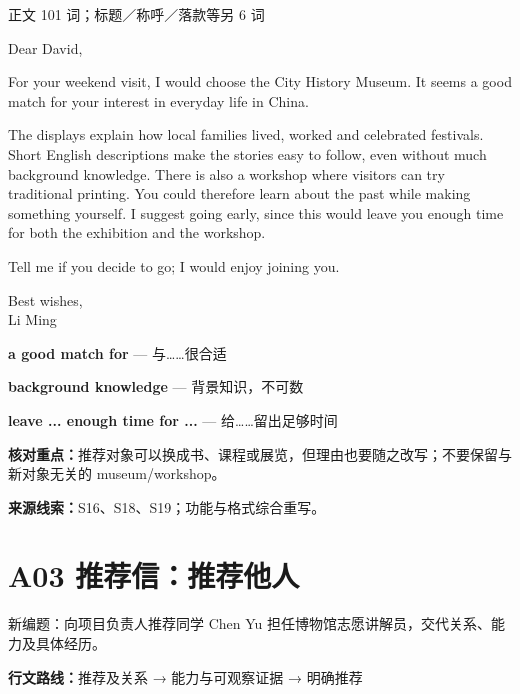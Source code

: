 \documentclass[11pt,a4paper,fontset=macnew]{ctexart}
\newenvironment{example}{\begingroup\fontsize{11}{14.3}\selectfont\setlength{\parskip}{4pt}}{\par\endgroup}
\begin{document}
\par\vspace{4pt}{\bfseries 完整套用示例}\par\nopagebreak
{\small 正文 101 词；标题／称呼／落款等另 6 词}\par
\begin{example}
\noindent Dear David,\par
For your weekend visit, I would choose the City History Museum. It seems a good match for your interest in everyday life in China.

The displays explain how local families lived, worked and celebrated festivals. Short English descriptions make the stories easy to follow, even without much background knowledge. There is also a workshop where visitors can try traditional printing. You could therefore learn about the past while making something yourself. I suggest going early, since this would leave you enough time for both the exhibition and the workshop.

Tell me if you decide to go; I would enjoy joining you.

\noindent Best wishes,\\Li Ming\par
\end{example}
\par\vspace{4pt}{\bfseries 好词好句：优先记这三处}\par\nopagebreak
{\small\textbf{a good match for} — 与……很合适}\par
{\small\textbf{background knowledge} — 背景知识，不可数}\par
{\small\textbf{leave ... enough time for ...} — 给……留出足够时间}\par
{\small\textbf{核对重点：}推荐对象可以换成书、课程或展览，但理由也要随之改写；不要保留与新对象无关的 museum/workshop。}\par
{\fontsize{8}{10}\selectfont\textbf{来源线索：}S16、S18、S19；功能与格式综合重写。}\par
\clearpage\section*{A03  推荐信：推荐他人}
{\small 新编题：向项目负责人推荐同学 Chen Yu 担任博物馆志愿讲解员，交代关系、能力及具体经历。}\par
{\small\textbf{行文路线：}推荐及关系 → 能力与可观察证据 → 明确推荐}\par
\end{document}
